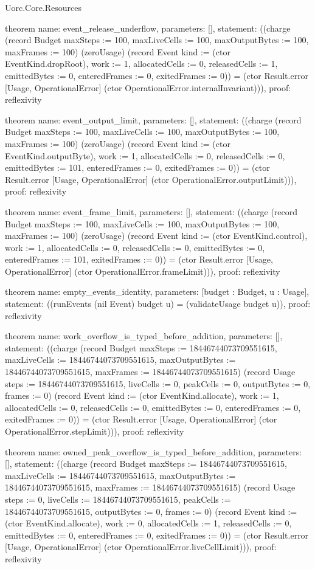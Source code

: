 \begin{lexlean}{Uorc.Core.Resources}
\begin{semanticmodule}
theorem{
  name: event_release_underflow,
  parameters: [],
  statement: ((charge (record Budget {maxSteps := 100, maxLiveCells := 100, maxOutputBytes := 100, maxFrames := 100}) (zeroUsage) (record Event {kind := (ctor EventKind.dropRoot), work := 1, allocatedCells := 0, releasedCells := 1, emittedBytes := 0, enteredFrames := 0, exitedFrames := 0})) = (ctor Result.error [Usage, OperationalError] (ctor OperationalError.internalInvariant))),
  proof: reflexivity{}
}

theorem{
  name: event_output_limit,
  parameters: [],
  statement: ((charge (record Budget {maxSteps := 100, maxLiveCells := 100, maxOutputBytes := 100, maxFrames := 100}) (zeroUsage) (record Event {kind := (ctor EventKind.outputByte), work := 1, allocatedCells := 0, releasedCells := 0, emittedBytes := 101, enteredFrames := 0, exitedFrames := 0})) = (ctor Result.error [Usage, OperationalError] (ctor OperationalError.outputLimit))),
  proof: reflexivity{}
}

theorem{
  name: event_frame_limit,
  parameters: [],
  statement: ((charge (record Budget {maxSteps := 100, maxLiveCells := 100, maxOutputBytes := 100, maxFrames := 100}) (zeroUsage) (record Event {kind := (ctor EventKind.control), work := 1, allocatedCells := 0, releasedCells := 0, emittedBytes := 0, enteredFrames := 101, exitedFrames := 0})) = (ctor Result.error [Usage, OperationalError] (ctor OperationalError.frameLimit))),
  proof: reflexivity{}
}

theorem{
  name: empty_events_identity,
  parameters: [budget : Budget, u : Usage],
  statement: ((runEvents (nil Event) budget u) = (validateUsage budget u)),
  proof: reflexivity{}
}

theorem{
  name: work_overflow_is_typed_before_addition,
  parameters: [],
  statement: ((charge (record Budget {maxSteps := 18446744073709551615, maxLiveCells := 18446744073709551615, maxOutputBytes := 18446744073709551615, maxFrames := 18446744073709551615}) (record Usage {steps := 18446744073709551615, liveCells := 0, peakCells := 0, outputBytes := 0, frames := 0}) (record Event {kind := (ctor EventKind.allocate), work := 1, allocatedCells := 0, releasedCells := 0, emittedBytes := 0, enteredFrames := 0, exitedFrames := 0})) = (ctor Result.error [Usage, OperationalError] (ctor OperationalError.stepLimit))),
  proof: reflexivity{}
}

theorem{
  name: owned_peak_overflow_is_typed_before_addition,
  parameters: [],
  statement: ((charge (record Budget {maxSteps := 18446744073709551615, maxLiveCells := 18446744073709551615, maxOutputBytes := 18446744073709551615, maxFrames := 18446744073709551615}) (record Usage {steps := 0, liveCells := 18446744073709551615, peakCells := 18446744073709551615, outputBytes := 0, frames := 0}) (record Event {kind := (ctor EventKind.allocate), work := 0, allocatedCells := 1, releasedCells := 0, emittedBytes := 0, enteredFrames := 0, exitedFrames := 0})) = (ctor Result.error [Usage, OperationalError] (ctor OperationalError.liveCellLimit))),
  proof: reflexivity{}
}


\end{semanticmodule}
\end{lexlean}
